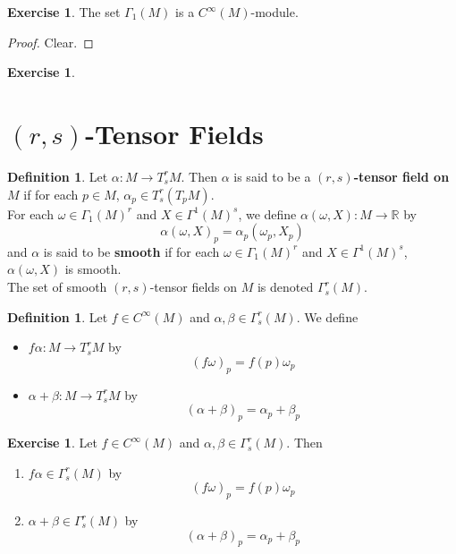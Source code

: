 \documentclass{book}
\theoremstyle{definition}
\newtheorem{defn}[definition]{Definition}
\newtheorem{ex}[definition]{Exercise}
\newcommand{\al}{\alpha}
\newcommand{\be}{\beta}
\newcommand{\om}{\omega}
\newcommand{\Gam}{\Gamma}
\newcommand{\R}{\mathbb{R}}
\DeclareMathOperator*{\0}{\mbf{0}}
\DeclareMathOperator*{\1}{\mbf{1}}
\begin{document}
	\begin{ex}
	The set $\Gam_1(M)$ is a $C^{\infty}(M)$-module.
	\end{ex}
	
	\begin{proof}
	Clear.
	\end{proof}
	
	
	\begin{ex}
	
	\end{ex}
	
	
	
	
	
	
	
	
	\newpage
	\section{$(r,s)$-Tensor Fields}
	
	\begin{defn}
		Let $\al: M \rightarrow T^r_sM$. Then $\al$ is said to be a \textbf{$(r,s)$-tensor field on $M$} if for each $p \in M$, $\al_p \in T^r_s(T_pM)$. \\
		For each $\om \in \Gam_1(M)^r$ and $X \in \Gam^1(M)^s$, we define $\al(\om, X) : M \rightarrow \R$ by $$\al(\om, X)_p = \al_p(\om_p, X_p)$$
		and $\al$ is said to be \textbf{smooth} if for each $\om \in \Gam_1(M)^r$ and $X \in \Gam^1(M)^s$, $\al(\om, X)$ is smooth. \\
		The set of smooth $(r,s)$-tensor fields on $M$ is denoted $\Gam^r_s(M)$.\\
	\end{defn}

	\begin{defn}
	Let $f \in C^{\infty}(M)$ and $\al,\be \in \Gam^r_s(M)$. We define 
	\begin{itemize}
	\item $f\al: M \rightarrow T^r_sM$ by $$(f\om)_p = f(p)\om_p$$
	\item $\al+\be:  M \rightarrow T^r_sM$ by $$(\al+\be)_p = \al_p+\be_p$$
	\end{itemize}
	\end{defn}
	
	\begin{ex}
	Let $f \in C^{\infty}(M)$ and $\al,\be \in \Gam^r_s(M)$. Then
	\begin{enumerate}
	\item $f\al \in \Gam^r_s(M)$ by $$(f\om)_p = f(p)\om_p$$
	\item $\al+\be \in \Gam^r_s(M)$ by $$(\al+\be)_p = \al_p+\be_p$$
	\end{enumerate}
	\end{ex}
	
\end{document}
